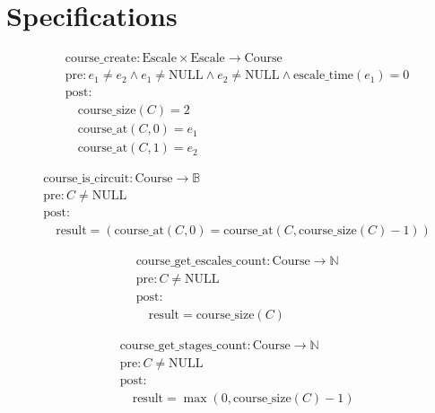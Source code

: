 \section{Specifications}\label{specifications}

\[
\begin{aligned}
&\text{course\_create}: \text{Escale} \times \text{Escale} \to \text{Course} \\
&\text{pre}: e_1 \neq e_2 \land e_1 \neq \text{NULL} \land e_2 \neq \text{NULL} \land \text{escale\_time}(e_1) = 0 \\
&\text{post}: \\
&\quad \text{course\_size}(C) = 2 \\
&\quad \text{course\_at}(C, 0) = e_1 \\
&\quad \text{course\_at}(C, 1) = e_2
\end{aligned}
\]





\[
\begin{aligned}
&\text{course\_is\_circuit}: \text{Course} \to \mathbb{B} \\
&\text{pre}: C \neq \text{NULL} \\
&\text{post}: \\
&\quad \text{result} = (\text{course\_at}(C, 0) = \text{course\_at}(C, \text{course\_size}(C)-1))
\end{aligned}
\]





\[
\begin{aligned}
&\text{course\_get\_escales\_count}: \text{Course} \to \mathbb{N} \\
&\text{pre}: C \neq \text{NULL} \\
&\text{post}: \\
&\quad \text{result} = \text{course\_size}(C)
\end{aligned}
\]





\[
\begin{aligned}
&\text{course\_get\_stages\_count}: \text{Course} \to \mathbb{N} \\
&\text{pre}: C \neq \text{NULL} \\
&\text{post}: \\
&\quad \text{result} = \max(0, \text{course\_size}(C) - 1)
\end{aligned}
\]





